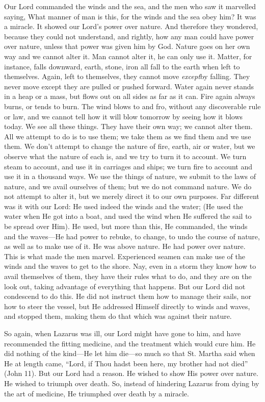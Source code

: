 Our
Lord commanded the winds and the sea, and the men who saw it marvelled
saying, What manner of man is this, for the winds and the sea obey
him? It was a miracle. It showed our Lord's power over nature. And
therefore they wondered, because they could not understand, and
rightly, how any man could have power over nature, unless that power
was given him by God. Nature goes on her own way and we cannot alter
it. Man cannot alter it, he can only use it. Matter, for instance,
falls downward, earth, stone, iron all fall to the earth when left to
themselves. Again, left to themselves, they cannot move \emph{except}by falling. They never move except they are pulled or pushed
forward. Water again never stands in a heap or a mass, but flows out
on all sides as far as it can. Fire again always burns, or tends to
burn. The wind blows to and fro, without any discoverable rule or law,
and we cannot tell how it will blow tomorrow by seeing how it
blows today. We see all these things. They have their own way; we
cannot alter them. All we attempt to do is to use them; we take them
as we find them and we use them. We don't attempt to change the nature
of fire, earth, air or water, but we observe what the nature of each
is, and we try to turn it to account. We turn steam to account, and
use it in carriages and ships; we turn fire to account and use it in a
thousand ways. We use the things of nature, we submit to the laws of
nature, and we avail ourselves of them; but we do not command nature.
We do not attempt to alter it, but we merely direct it to our own
purposes. Far different was it with our Lord: He used indeed the winds
and the water; (He used the water when He got into a boat, and used
the wind when He suffered the sail to be spread over Him). He used,
but more than this, He commanded, the winds and the waves—He had
power to rebuke, to change, to undo the course of nature, as well as
to make use of it. He was above nature. He had power over nature. This
is what made the men marvel. Experienced seamen can make use of the
winds and the waves to get to the shore. Nay, even in a storm they
know how to avail themselves of them, they have their rules what to
do, and they are on the look out, taking advantage of everything that
happens. But our Lord did not condescend to do this. He did not
instruct them how to manage their sails, nor how to steer the vessel,
but He addressed Himself directly to winds and waves, and stopped
them, making them do that which was against their nature.

So again, when Lazarus was ill, our Lord might
have gone to him, and have recommended the fitting medicine, and the
treatment which would cure him. He did nothing of the kind—He let
him die—so much so that St. Martha said when He at length came,
``Lord, if Thou hadst been here, my brother had not died'' (John
11). But our Lord had a reason. He wished to show His power over
nature. He wished to triumph over death. So, instead of hindering
Lazarus from dying by the art of medicine, He triumphed over death by
a miracle.

